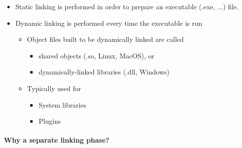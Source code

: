 \documentclass[12pt]{article}
\begin{document}
\begin{itemize}
    \item Static linking is performed in order to prepare an executable (.exe, ...) file.
    \item Dynamic linking is performed every time the executable is run
    \begin{itemize}
        \item Object files built to be dynamically linked are called
        \begin{itemize}
            \item shared objects (.so, Linux, MacOS), or
            \item dynamically-linked libraries (.dll, Windows)
        \end{itemize}
        \item Typically used for
        \begin{itemize}
            \item System libraries
            \item Plugins
        \end{itemize}
    \end{itemize}
\end{itemize}

\paragraph{Why a separate linking phase?}
\end{document}
